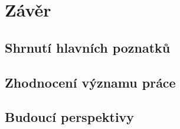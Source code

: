 \chapter{Závěr}
\section{Shrnutí hlavních poznatků}
\section{Zhodnocení významu práce}
\section{Budoucí perspektivy}


%
